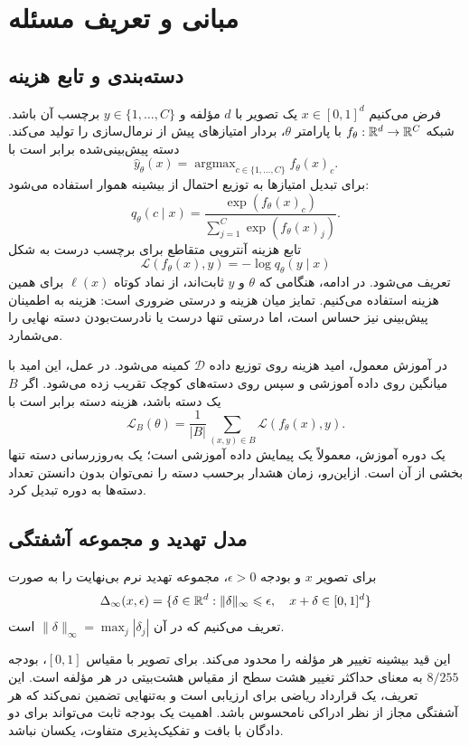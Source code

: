 \chapter{مبانی و تعریف مسئله}
\label{ch:preliminaries}

\section{دسته‌بندی و تابع هزینه}
فرض می‌کنیم $x\in[0,1]^d$ یک تصویر با $d$ مؤلفه و $y\in\{1,\ldots,C\}$ برچسب آن باشد. شبکه $f_\theta:\mathbb{R}^d\to\mathbb{R}^C$ با پارامتر $\theta$، بردار امتیازهای پیش از نرمال‌سازی را تولید می‌کند. دسته پیش‌بینی‌شده برابر است با
\begin{equation}
\widehat y_\theta(x)=\mathop{\arg\max}_{c\in\{1,\ldots,C\}} f_\theta(x)_c.
\end{equation}
برای تبدیل امتیازها به توزیع احتمال از بیشینه هموار استفاده می‌شود:
\begin{equation}
q_\theta(c\mid x)=\frac{\exp(f_\theta(x)_c)}{\sum_{j=1}^{C}\exp(f_\theta(x)_j)}.
\end{equation}
تابع هزینه آنتروپی متقاطع برای برچسب درست به شکل
\begin{equation}\label{eq:crossentropy}
\mathcal L(f_\theta(x),y)=-\log q_\theta(y\mid x)
\end{equation}
تعریف می‌شود. در ادامه، هنگامی که $\theta$ و $y$ ثابت‌اند، از نماد کوتاه $\ell(x)$ برای همین هزینه استفاده می‌کنیم. تمایز میان هزینه و درستی ضروری است: هزینه به اطمینان پیش‌بینی نیز حساس است، اما درستی تنها درست یا نادرست‌بودن دسته نهایی را می‌شمارد.

در آموزش معمول، امید هزینه روی توزیع داده $\mathcal D$ کمینه می‌شود. در عمل، این امید با میانگین روی داده آموزشی و سپس روی دسته‌های کوچک تقریب زده می‌شود. اگر $B$ یک دسته باشد، هزینه دسته برابر است با
\begin{equation}
\mathcal L_B(\theta)=\frac{1}{|B|}\sum_{(x,y)\in B}\mathcal L(f_\theta(x),y).
\end{equation}
یک دوره آموزش، معمولاً یک پیمایش داده آموزشی است؛ یک به‌روزرسانی دسته تنها بخشی از آن است. ازاین‌رو، زمان هشدار برحسب دسته را نمی‌توان بدون دانستن تعداد دسته‌ها به دوره تبدیل کرد.

\section{مدل تهدید و مجموعه آشفتگی}
\begin{تعریف}
برای تصویر $x$ و بودجه $\epsilon>0$، مجموعه تهدید نرم بی‌نهایت را به صورت
\begin{equation}\label{eq:threatset}
\Delta_\infty(x,\epsilon)=\{\delta\in\mathbb{R}^d:\|\delta\|_\infty\leqslant\epsilon,\quad x+\delta\in[0,1]^d\}
\end{equation}
تعریف می‌کنیم که در آن $\|\delta\|_\infty=\max_j|\delta_j|$ است.
\end{تعریف}
این قید بیشینه تغییر هر مؤلفه را محدود می‌کند. برای تصویر با مقیاس $[0,1]$، بودجه $8/255$ به معنای حداکثر تغییر هشت سطح از مقیاس هشت‌بیتی در هر مؤلفه است. این تعریف، یک قرارداد ریاضی برای ارزیابی است و به‌تنهایی تضمین نمی‌کند که هر آشفتگی مجاز از نظر ادراکی نامحسوس باشد. اهمیت یک بودجه ثابت می‌تواند برای دو دادگان با بافت و تفکیک‌پذیری متفاوت، یکسان نباشد.

